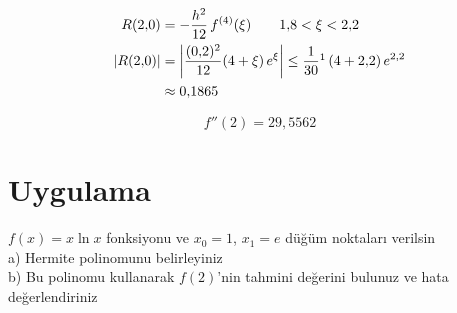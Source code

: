 \documentclass[11pt,a4paper]{article}
\begin{document}
\begin{align*}
  R(2{,}0) &= -\frac{h^2}{12}\,f^{(4)}(\xi) \qquad 1{,}8 < \xi < 2{,}2\\
  |R(2{,}0)| &= \left|\frac{(0{,}2)^2}{12}(4+\xi)\,e^{\xi}\right|
     \le \frac{1}{30}\footnotemark\,(4+2{,}2)\,e^{2{,}2}\\
     &\approx 0{,}1865
\end{align*}

\[
  f''(2) = 29{,}5562
\]

\section{Uygulama}
\begin{ornek}[1]
$f(x) = x\ln x$ fonksiyonu ve $x_0 = 1$, $x_1 = e$ düğüm noktaları verilsin\\
a) Hermite polinomunu belirleyiniz\\
b) Bu polinomu kullanarak $f(2)$'nin tahmini değerini bulunuz ve hata değerlendiriniz
\end{ornek}
\end{document}
